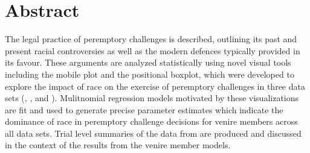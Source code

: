 \chapter*{Abstract}

The legal practice of peremptory challenges is described, outlining its past and present racial controversies as well as the
modern defences typically provided in its favour. These arguments are analyzed statistically using novel visual tools including
the mobile plot and the positional boxplot, which were developed to explore the impact of race on the exercise of peremptory
challenges in three data sets (\cite{JurySunshineProj}, \cite{StubbornLegacy}, and \cite{PerempChalMurder}). Mulitnomial
regression models motivated by these visualizations are fit and used to generate precise parameter estimates which indicate the
dominance of race in peremptory challenge decisions for venire members across all data sets. Trial level summaries of the data
from \cite{JurySunshineProj} are produced and discussed in the context of the results from the venire member models.
 

